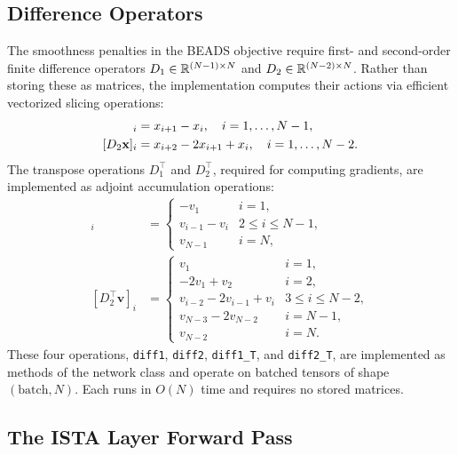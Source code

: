\subsection{Difference Operators}
\label{sec:method_diff_ops}

The smoothness penalties in the BEADS objective require first- and second-order finite difference operators $D_1 \in {\mathbb R}^{(N-1) \times N}$ and $D_2 \in {\mathbb R}^{(N-2) \times N}$. Rather than storing these as matrices, the implementation computes their actions via efficient vectorized slicing operations:
\begin{align}
    [D_1 \xvec]_i &= x_{i+1} - x_i, \quad i = 1, \ldots, N-1, \label{eq:diff1} \\
    [D_2 \xvec]_i &= x_{i+2} - 2x_{i+1} + x_i, \quad i = 1, \ldots, N-2. \label{eq:diff2}
\end{align}
The transpose operations $D_1^\top$ and $D_2^\top$, required for computing gradients, are implemented as adjoint accumulation operations:
\begin{align}
    [D_1^\top \mathbf{v}]_i &=
    \begin{cases}
        -v_1 & i = 1, \\
        v_{i-1} - v_i & 2 \leq i \leq N-1, \\
        v_{N-1} & i = N,
    \end{cases} \label{eq:diff1_T} \\[6pt]
    [D_2^\top \mathbf{v}]_i &=
    \begin{cases}
        v_1 & i = 1, \\
        -2v_1 + v_2 & i = 2, \\
        v_{i-2} - 2v_{i-1} + v_i & 3 \leq i \leq N-2, \\
        v_{N-3} - 2v_{N-2} & i = N-1, \\
        v_{N-2} & i = N.
    \end{cases} \label{eq:diff2_T}
\end{align}
These four operations, \texttt{diff1}, \texttt{diff2}, \texttt{diff1\_T}, and \texttt{diff2\_T}, are implemented as methods of the network class and operate on batched tensors of shape $(\text{batch}, N)$. Each runs in $O(N)$ time and requires no stored matrices.


\subsection{The ISTA Layer Forward Pass}
\label{sec:method_forward}

